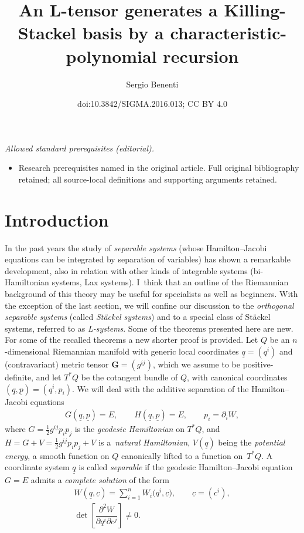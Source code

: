 \documentclass[10pt,a4paper]{amsart}
\title{An L-tensor generates a Killing-Stackel basis by a characteristic-polynomial recursion}
\author{Sergio Benenti}
\date{doi:10.3842/SIGMA.2016.013; CC BY 4.0}
\def\bs{\boldsymbol}
\numberwithin{equation}{section}
\begin{document}
\maketitle
\noindent\textit{Allowed standard prerequisites (editorial).}\begin{itemize}
\item Research prerequisites named in the original article. Full original bibliography retained; all source-local definitions and supporting arguments retained.
\end{itemize}\medskip
\section{Introduction}\label{section1}

In the past years the study of {\it separable systems} (whose Hamilton--Jacobi equations can be integrated by separation of variables) has shown a remarkable development, also in relation with other kinds of integrable systems (bi-Hamiltonian systems, Lax systems). I~think that an outline of the Riemannian background of this theory may be useful for specialists as well as beginners. With the exception of the last section, we will conf\/ine our discussion to the {\it orthogonal separable systems} (called {\it St\"ackel systems}) and to a special class of St\"ackel systems, referred to as {\it L-systems}. Some of the theorems presented here are new. For some of the recalled theorems a new shorter proof is provided.
Let $Q$ be an $n$-dimensional Riemannian manifold with generic local coordinates $\underline q=(q^i)$ and (contravariant) metric tensor $\bs G=(g^{ij})$, which we assume to be positive-def\/inite, and let $T^*Q$ be the cotangent bundle of $Q$, with canonical coordinates $(\underline q,\underline p)=(q^i,p_i)$. We will deal with the additive separation of the Hamilton--Jacobi equations
\begin{gather*}
G(\underline q,\underline p)=E, \qquad
H(\underline q,\underline p)=E, \qquad  p_i=\partial_iW,
\end{gather*}
where $G=\tfrac 12 g^{ij} p_ip_j$ is the {\it geodesic Hamiltonian} on $T^*Q$, and   $H=G+V=\tfrac 12 g^{ij} p_ip_j+V$ is a~{\it natural Hamiltonian}, $V(\underline q)$  being the {\it potential energy}, a smooth function on $Q$ canonically lifted to a function on~$T^*Q$. A coordinate system $\underline q$ is called {\it separable} if the geodesic Hamilton--Jacobi equation $G=E$ admits a {\it complete solution} of the form
\begin{subequations}\label{(1.1)}
\begin{gather}
W(\underline q,\underline c)=\sum _{i=1}^n W_i\big(q^i,\underline c\big),\qquad \underline c=(c^i), \label{(1.1)1}\\
\det\left[\dfrac{\partial^2W}{\partial q^i\partial c^j}\right]\neq 0.\label{(1.1)2}
\end{gather}
\end{subequations}
\end{document}

